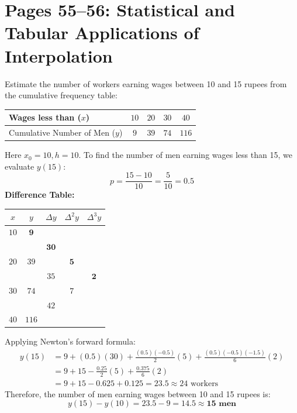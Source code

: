 \section{Pages 55--56: Statistical and Tabular Applications of Interpolation}
\label{sec:census_wage_problem}

\begin{examplebox}
Estimate the number of workers earning wages between 10 and 15 rupees from the cumulative frequency table:
\begin{center}
\begin{tabular}{|l|c|c|c|c|}
\hline
Wages less than ($x$) & $10$ & $20$ & $30$ & $40$ \\
\hline
Cumulative Number of Men ($y$) & $9$ & $39$ & $74$ & $116$ \\
\hline
\end{tabular}
\end{center}
Here $x_0 = 10, h = 10$. To find the number of men earning wages less than 15, we evaluate $y(15)$:
\begin{equation}
    p = \frac{15 - 10}{10} = \frac{5}{10} = 0.5
\end{equation}
\textbf{Difference Table:}
\begin{center}
\renewcommand{\arraystretch}{1.2}
\begin{tabular}{|c|c|c|c|c|}
\hline
$x$ & $y$ & $\Delta y$ & $\Delta^2 y$ & $\Delta^3 y$ \\
\hline
$10$ & $\mathbf{9}$ & & & \\
     &   & $\mathbf{30}$ & & \\
$20$ & $39$ & & $\mathbf{5}$ & \\
     &   & $35$ & & $\mathbf{2}$ \\
$30$ & $74$ & & $7$ & \\
     &   & $42$ & & \\
$40$ & $116$ & & & \\
\hline
\end{tabular}
\end{center}
Applying Newton's forward formula:
\begin{align}
    y(15) &= 9 + (0.5)(30) + \frac{(0.5)(-0.5)}{2}(5) + \frac{(0.5)(-0.5)(-1.5)}{6}(2) \nonumber \\
    &= 9 + 15 - \frac{0.25}{2}(5) + \frac{0.375}{6}(2) \nonumber \\
    &= 9 + 15 - 0.625 + 0.125 = \mathbf{23.5} \approx 24 \text{ workers}
\end{align}
Therefore, the number of men earning wages between 10 and 15 rupees is:
\begin{equation}
    y(15) - y(10) = 23.5 - 9 = \mathbf{14.5} \approx \mathbf{15 \text{ men}}
\end{equation}
\end{examplebox}

